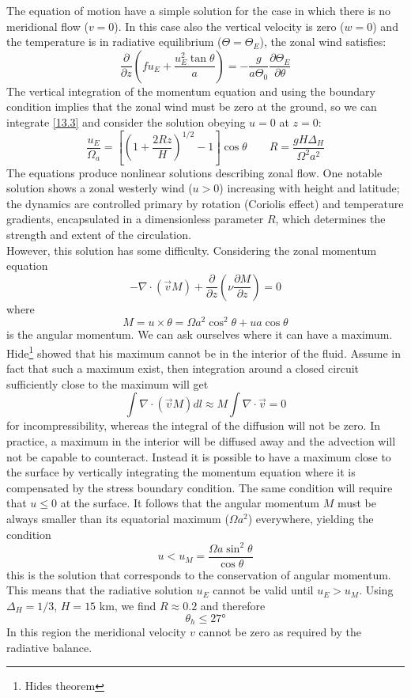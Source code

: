 The equation of motion have a simple solution for the case in which there is no meridional flow ($v=0$). In this case also the vertical velocity is zero ($w=0$) and the temperature is in radiative equilibrium ($\Theta=\Theta_E$), the zonal wind satisfies:
\begin{equation}\label{13.3}
    \frac{\partial}{\partial z}\left(fu_E+\frac{u_E^2\tan\theta}{a}\right)=-\frac{g}{a\Theta_0}\frac{\partial\Theta_E}{\partial\theta}
\end{equation}
The vertical integration of the momentum equation and using the boundary condition implies that the zonal wind must be zero at the ground, so we can integrate \ref{13.3} and consider the solution obeying $u=0$ at $z=0$: 
\begin{equation}\label{13.5}
    \frac{u_E}{\Omega_a}=\left[\left(1+\frac{2Rz}{H}\right)^{1/2}-1\right]\cos\theta\qquad R=\frac{gH\Delta_H}{\Omega^2a^2}
\end{equation}
The equations produce nonlinear solutions describing zonal flow. One notable solution shows a zonal westerly wind ($u>0$) increasing with height and latitude; the dynamics are controlled primary by rotation (Coriolis effect) and temperature gradients, encapsulated in a dimensionless parameter $R$, which determines the strength and extent of the circulation.\\


However, this solution has some difficulty. Considering the zonal momentum equation
\begin{equation}
    -\nabla\cdot(\vec{v}M)+\frac{\partial}{\partial z}\left(\nu\frac{\partial M}{\partial z}\right)=0
\end{equation}
where
$$M=u\times\theta=\Omega a^2\cos^2\theta+ua\cos\theta$$ is the angular momentum. We can ask ourselves where it can have a maximum. Hide\footnote{Hides theorem} showed that his maximum cannot be in the interior of the fluid. Assume in fact that such a maximum exist, then integration around a closed circuit sufficiently close to the maximum will get
$$\int\nabla\cdot(\vec{v}M)dl\approx M\int\nabla\cdot\vec{v}=0$$
for incompressibility, whereas the integral of the diffusion will not be zero. In practice, a maximum in the interior will be diffused away and the advection will not be capable to counteract. Instead it is possible to have a maximum close to the surface by vertically integrating the momentum equation where it is compensated by the stress boundary condition. The same condition will require that $u\leq 0$ at the surface. It follows that the angular momentum $M$ must be always smaller than its equatorial maximum ($\Omega a^2$) everywhere, yielding the condition 
\begin{equation}\label{eq.umax}
    u<u_M=\frac{\Omega a\sin^2\theta}{\cos\theta}
\end{equation}
this is the solution that corresponds to the conservation of angular momentum. This means that the radiative solution $u_E$ cannot be valid until $u_E>u_M$. Using $\Delta_H=1/3$, $H=15$ km, we find $R\approx 0.2$ and therefore
$$\theta_h\leq27\text{°}$$
In this region the meridional velocity $v$ cannot be zero as required by the radiative balance.  



